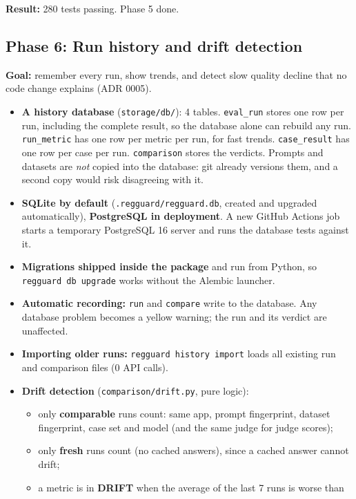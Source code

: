 \documentclass[11pt,a4paper]{article}
\newcommand{\code}[1]{\nolinkurl{#1}}
\begin{document}
\textbf{Result:} 280 tests passing. Phase 5 done.

\subsection{Phase 6: Run history and drift detection}
\textbf{Goal:} remember every run, show trends, and detect slow quality decline that no code
change explains (ADR 0005).
\begin{itemize}
  \item \textbf{A history database} (\code{storage/db/}): 4 tables. \code{eval_run} stores one
        row per run, including the complete result, so the database alone can rebuild any run.
        \code{run_metric} has one row per metric per run, for fast trends. \code{case_result}
        has one row per case per run. \code{comparison} stores the verdicts. Prompts and
        datasets are \emph{not} copied into the database: git already versions them, and a
        second copy would risk disagreeing with it.
  \item \textbf{SQLite by default} (\code{.regguard/regguard.db}, created and upgraded
        automatically), \textbf{PostgreSQL in deployment}. A new GitHub Actions job starts a
        temporary PostgreSQL 16 server and runs the database tests against it.
  \item \textbf{Migrations shipped inside the package} and run from Python, so
        \texttt{regguard db upgrade} works without the Alembic launcher.
  \item \textbf{Automatic recording:} \texttt{run} and \texttt{compare} write to the database.
        Any database problem becomes a yellow warning; the run and its verdict are unaffected.
  \item \textbf{Importing older runs:} \texttt{regguard history import} loads all existing run
        and comparison files (0 API calls).
  \item \textbf{Drift detection} (\code{comparison/drift.py}, pure logic):
        \begin{itemize}
          \item only \textbf{comparable} runs count: same app, prompt fingerprint, dataset
                fingerprint, case set and model (and the same judge for judge scores);
          \item only \textbf{fresh} runs count (no cached answers), since a cached answer cannot drift;
          \item a metric is in \textbf{DRIFT} when the average of the last 7 runs is worse than

\end{itemize}
\end{itemize}
\end{document}
